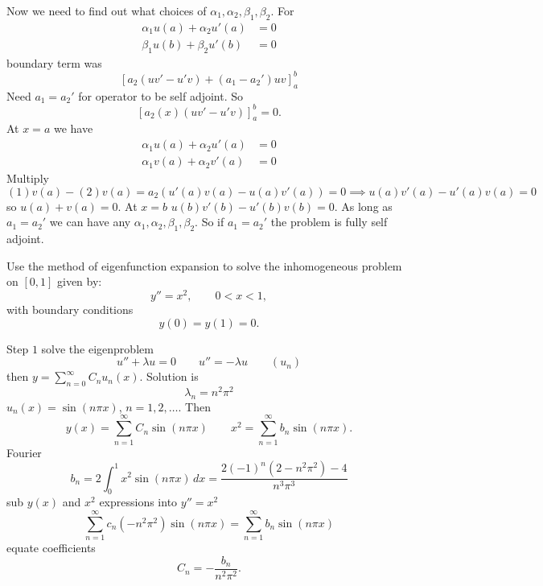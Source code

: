 \documentclass[10pt, a4paper]{article}
\begin{document}
\begin{problem}
\begin{solution}
        Now we need to find out what choices of $\alpha_1, \alpha_2, \beta_1, \beta_2$.
        For
        \begin{align*}
            \alpha_1 u(a) + \alpha_2 u'(a) &= 0 \\
            \beta_1 u(b) + \beta_2 u'(b) &= 0
        \end{align*}
        boundary term was
        \[
        \left[a_2(uv' - u'v) + (a_1 - a_2')uv\right]_{a}^{b}
        \]
        Need $a_1 = a_2'$ for operator to be self adjoint.
        So
        \[
        \left[a_2(x)(uv' - u'v)\right]_{a}^{b} = 0.
        \]
        At $x = a$ we have
        \begin{align}
            \alpha_1u(a) + \alpha_2u'(a) &= 0 \\
            \alpha_1v(a) + \alpha_2v'(a) &= 0
        \end{align}
        Multiply
        \[
        (1)v(a) - (2)v(a) = a_2(u'(a)v(a) - u(a)v'(a)) = 0 \implies u(a)v'(a) - u'(a)v(a) = 0
        \]
        so $u(a) + v(a) = 0$.
        At $x = b$
        $u(b)v'(b) - u'(b)v(b) = 0$.
        As long as $a_1 = a_2'$ we can have any $\alpha_1, \alpha_2, \beta_1, \beta_2$.
        So if $a_1 = a_2'$ the problem is fully self adjoint.
    \end{solution}
\end{problem}

\begin{problem}\phantom{}
    Use the method of eigenfunction expansion to solve the inhomogeneous problem on $[0, 1]$ given by:
    \[
    y'' = x ^ 2,\qquad 0 < x < 1,
    \]
    with boundary conditions
    \[
    y(0) = y(1) = 0.
    \]

    \begin{solution}
        Step $1$ solve the eigenproblem
        \[
        u'' + \lambda u = 0\qquad u'' = -\lambda u\qquad (u_n)
        \]
        then $y = \sum_{n = 0}^{\infty}C_nu_n(x)$.
        Solution is
        \[
        \lambda_n = n ^ 2\pi ^ 2
        \]
        $u_n(x) = \sin(n\pi x)$,
        $n = 1, 2, \dotsc$.
        Then
        \[
        y(x) = \sum_{n = 1}^{\infty}C_n\sin(n\pi x)\qquad x ^ 2 = \sum_{n = 1}^{\infty}b_n\sin(n\pi x).
        \]
        Fourier
        \[
        b_n = 2\int_{0}^{1}x ^ 2\sin(n\pi x)\,dx = \frac{2(-1) ^ n(2 - n ^ 2\pi ^ 2) - 4}{n ^ 3\pi ^ 3}
        \]
        sub $y(x)$ and $x ^ 2$ expressions into $y'' = x ^ 2$
        \[
        \sum_{n = 1}^{\infty}c_n(-n ^ 2\pi ^ 2)\sin(n\pi x) = \sum_{n = 1}^{\infty}b_n\sin(n\pi x)
        \]
        equate coefficients
        \[
        C_n = -\frac{b_n}{n ^ 2\pi ^ 2}.
        \]
    \end{solution}
\end{problem}
\end{document}
